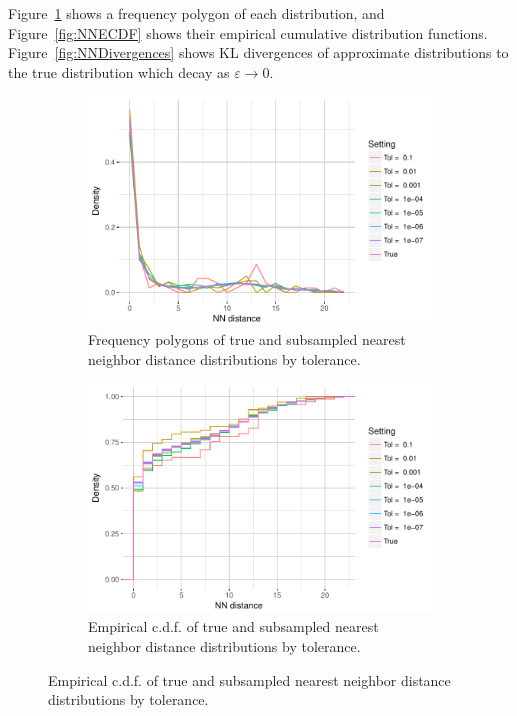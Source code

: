 \documentclass{article}
\begin{document}
Figure~\ref{fig:NNFreqPoly} shows a frequency polygon of each distribution, and Figure~\ref{fig:NNECDF} shows their empirical cumulative distribution functions.
Figure~\ref{fig:NNDivergences} shows KL divergences of approximate distributions to the true distribution which decay as $\varepsilon \to 0$.
\begin{figure}
    \begin{subfigure}{.49\textwidth}
        \includegraphics[width=\linewidth]{Figures/NearestNeighbor/CDR3/freqpoly_by_tol.pdf}
   		\caption{Frequency polygons of true and subsampled nearest neighbor distance distributions by tolerance.}
    	\label{fig:NNFreqPoly}
    \end{subfigure}
    \begin{subfigure}{.49\textwidth}
        \includegraphics[width=\linewidth]{Figures/NearestNeighbor/CDR3/ecdf_by_tol.pdf}
    	\caption{Empirical c.d.f. of true and subsampled nearest neighbor distance distributions by tolerance.}

\end{subfigure}
\end{figure}
\end{document}
